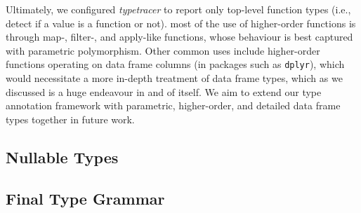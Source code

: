 \documentclass[acmsmall,review,anonymous]{acmart}\settopmatter{printfolios=true,printccs=false,printacmref=false}
\newcommand{\code}[1]{{\lstinline[style=Rin]!#1!}\xspace}
\newcommand{\typetracer}{\emph{typetracer}\xspace} %
\begin{document}
Ultimately, we configured \typetracer to report only top-level function types (i.e., detect if a value is a function or not).
 most of the use of higher-order functions is through map-, filter-, and apply-like functions, whose behaviour is best captured with parametric polymorphism.
Other common uses include higher-order functions operating on data frame columns (in packages such as \code{dplyr}), which would necessitate a more in-depth treatment of data frame types, which as we discussed is a huge endeavour in and of itself.
We aim to extend our type annotation framework with parametric, higher-order, and detailed data frame types together in future work.


%
%
%
%
\subsection{Nullable Types}



%
%
%
%
\subsection{Final Type Grammar}
\label{subsec:typegrammar}
\end{document}
